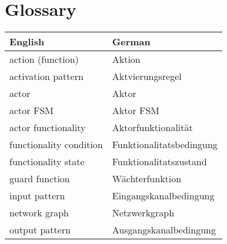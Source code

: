 \chapter{Glossary}

\begin{tabular}[t]{|l|l|}
\hline
  English                     & German                    \\
\hline\hline
  action (function)	      & Aktion			  \\\hline
  activation pattern          & Aktvierungsregel          \\\hline
  actor                       & Aktor                     \\\hline
  actor FSM                   & Aktor FSM		  \\\hline
  actor functionality         & Aktorfunktionalität       \\\hline
  functionality condition     & Funktionalitatsbedingung  \\\hline
  functionality state         & Funktionalitatszustand    \\\hline
  guard function              & Wächterfunktion           \\\hline
  input pattern               & Eingangskanalbedingung    \\\hline
  network graph               & Netzwerkgraph             \\\hline
  output pattern              & Ausgangskanalbedingung    \\\hline
\end{tabular}
